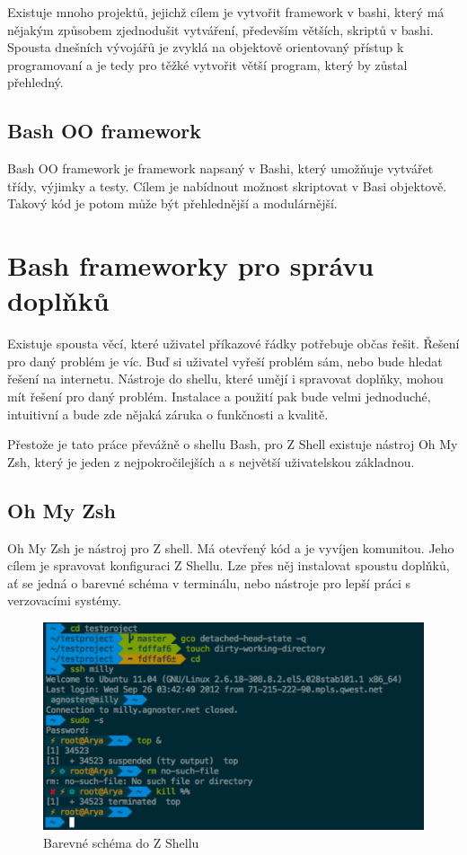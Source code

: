 \documentclass[thesis=M,czech]{FITthesis}[2012/06/26]
\begin{document}
Existuje mnoho projektů, jejichž cílem je vytvořit framework v bashi, který má nějakým způsobem zjednodušit vytváření, především větších, skriptů v bashi. Spousta dnešních vývojářů je zvyklá na objektově orientovaný přístup k programovaní a je tedy pro těžké vytvořit větší program, který by zůstal přehledný.

\subsection{Bash OO framework}
Bash OO framework je framework napsaný v Bashi, který umožňuje vytvářet třídy, výjimky a testy. Cílem je nabídnout možnost skriptovat  v Basi objektově. Takový kód je potom může být přehlednější a modulárnější. 


%
%
%
%
%

\section{Bash frameworky pro správu doplňků}

Existuje spousta věcí, které uživatel příkazové řádky potřebuje občas řešit. Řešení pro daný problém je víc. Buď si uživatel vyřeší problém sám, nebo bude hledat řešení na internetu. Nástroje do shellu, které umějí i spravovat doplňky, mohou mít řešení pro daný problém. Instalace a použití pak bude velmi jednoduché, intuitivní a bude zde nějaká záruka o funkčnosti a kvalitě.

Přestože je tato práce převážně o shellu Bash, pro Z Shell existuje nástroj Oh My Zsh, který je jeden z nejpokročilejších a s největší uživatelskou základnou.

%
%
%
\subsection{Oh My Zsh}

Oh My Zsh je nástroj pro Z shell. Má otevřený kód a je vyvíjen komunitou. Jeho cílem je spravovat konfiguraci Z Shellu. Lze přes něj instalovat spoustu doplňků, ať se jedná o barevné schéma v terminálu, nebo nástroje pro lepší práci s verzovacími systémy.

\begin{figure}[htb]\centering
	\includegraphics[width=\textwidth]{./images/zsh_theme}
	\caption{Barevné schéma do Z Shellu}
	\label{fig:shell_history}
\end{figure}
\end{document}
